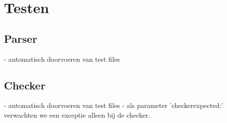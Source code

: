\chapter{Testen}
\section{Parser}
- automatisch doorvoeren van test files

\section{Checker}
- automatisch doorvoeren van test files
- als parameter 'checkerexpected:' verwachten we een exceptie alleen bij de checker.
